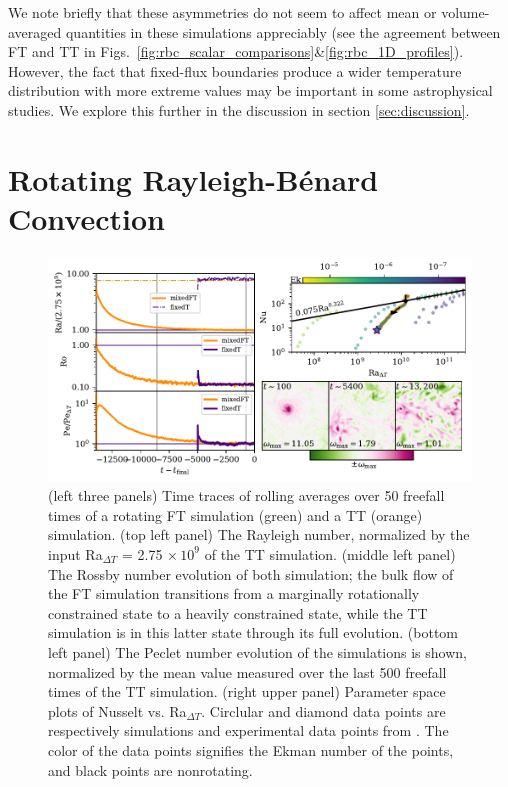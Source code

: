 \documentclass[aps, pre, onecolumn, nofootinbib, notitlepage, groupedaddress, amsfonts, amssymb, amsmath, longbibliography, superscriptaddress]{revtex4-1}
\newcommand{\RB}{Rayleigh-B\'{e}nard }
\begin{document}
We note briefly that these asymmetries do not seem to affect mean or volume-averaged quantities in these simulations appreciably (see the agreement between FT and TT in Figs.~\ref{fig:rbc_scalar_comparisons}\&\ref{fig:rbc_1D_profiles}).
However, the fact that fixed-flux boundaries produce a wider temperature distribution with more extreme values may be important in some astrophysical studies.
We explore this further in the discussion in section \ref{sec:discussion}.





\section{Rotating \RB Convection}
\label{sec:rotating_results}
\begin{figure}
\includegraphics[width=\textwidth]{./figs/rotating_panels.pdf}
\caption{ 
	(left three panels) Time traces of rolling averages over 50 freefall times of a rotating FT simulation (green) and a TT (orange) simulation.
	(top left panel) The Rayleigh number, normalized by the input Ra$_{\Delta T}$ = 2.75$\,\times 10^9$ of the TT simulation.
	(middle left panel) The Rossby number evolution of both simulation; the bulk flow of the FT simulation transitions from a marginally rotationally constrained state to a heavily constrained state, while the TT simulation is in this latter state through its full evolution.
	(bottom left panel) The Peclet number evolution of the simulations is shown, normalized by the mean value measured over the last 500 freefall times of the TT simulation.
	(right upper panel) Parameter space plots of Nusselt vs. Ra$_{\Delta T}$.
	Circlular and diamond data points are respectively simulations and experimental data points from \cite{cheng&all2015}.
	The color of the data points signifies the Ekman number of the points, and black points are nonrotating.
}
\end{figure}
\end{document}
